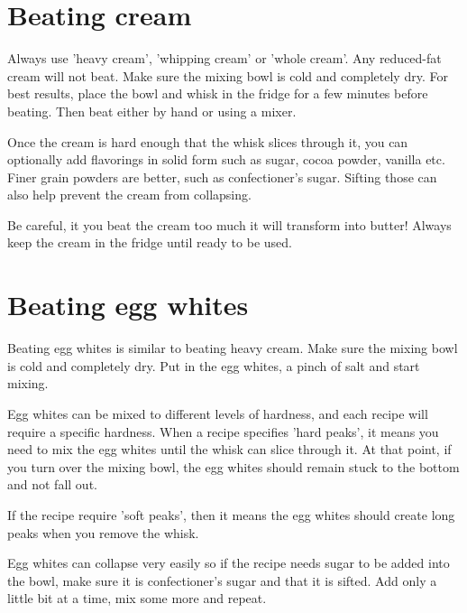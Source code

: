 \documentclass[10pt]{book}
\begin{document}
\newpage
\section*{Beating cream}

\indent\indent Always use 'heavy cream', 'whipping cream' or 'whole cream'. Any reduced-fat cream will not beat. Make sure the mixing bowl is cold and completely dry. For best results, place the bowl and whisk in the fridge for a few minutes before beating. Then beat either by hand or using a mixer. 

Once the cream is hard enough that the whisk slices through it, you can optionally add flavorings in solid form such as sugar, cocoa powder, vanilla etc. Finer grain powders are better, such as confectioner's sugar. Sifting those can also help prevent the cream from collapsing.

Be careful, it you beat the cream too much it will transform into butter! Always keep the cream in the fridge until ready to be used.

\newpage
\section*{Beating egg whites}

\indent\indent Beating egg whites is similar to beating heavy cream. Make sure the mixing bowl is cold and completely dry. Put in the egg whites, a pinch of salt and start mixing.

Egg whites can be mixed to different levels of hardness, and each recipe will require a specific hardness. When a recipe specifies 'hard peaks', it means you need to mix the egg whites until the whisk can slice through it. At that point, if you turn over the mixing bowl, the egg whites should remain stuck to the bottom and not fall out.

If the recipe require 'soft peaks', then it means the egg whites should create long peaks when you remove the whisk.

Egg whites can collapse very easily so if the recipe needs sugar to be added into the bowl, make sure it is confectioner's sugar and that it is sifted. Add only a little bit at a time, mix some more and repeat.

\end{document}
